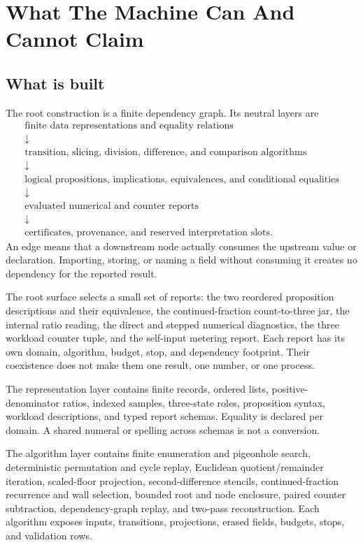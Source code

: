 \chapter{What The Machine Can And Cannot Claim}

\section{What is built}

The root construction is a finite dependency graph.  Its neutral layers are
\[
\begin{array}{c}
\text{finite data representations and equality relations}\\
\downarrow\\
\text{transition, slicing, division, difference, and comparison algorithms}\\
\downarrow\\
\text{logical propositions, implications, equivalences, and conditional equalities}\\
\downarrow\\
\text{evaluated numerical and counter reports}\\
\downarrow\\
\text{certificates, provenance, and reserved interpretation slots}.
\end{array}
\]
An edge means that a downstream node actually consumes the upstream value or declaration.  Importing, storing, or
naming a field without consuming it creates no dependency for the reported result.

The root surface selects a small set of reports: the two reordered proposition descriptions and their equivalence,
the continued-fraction count-to-three jar, the internal ratio reading, the direct and stepped numerical diagnostics,
the three workload counter tuple, and the self-input metering report.  Each report has its own domain, algorithm,
budget, stop, and dependency footprint.  Their coexistence does not make them one result, one number, or one process.

The representation layer contains finite records, ordered lists, positive-denominator ratios, indexed samples,
three-state roles, proposition syntax, workload descriptions, and typed report schemas.  Equality is declared per
domain.  A shared numeral or spelling across schemas is not a conversion.

The algorithm layer contains finite enumeration and pigeonhole search, deterministic permutation and cycle replay,
Euclidean quotient/remainder iteration, scaled-floor projection, second-difference stencils, continued-fraction
recurrence and wall selection, bounded root and node enclosure, paired counter subtraction, dependency-graph replay,
and two-pass reconstruction.  Each algorithm exposes inputs, transitions, projections, erased fields, budgets,
stops, and validation rows.


